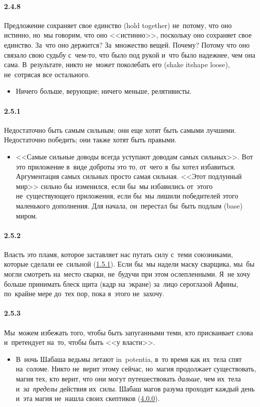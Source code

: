 \paragraph{2.4.8}\hypertarget{par:2.4.8}{} Предложение сохраняет свое единство (hold together) не~потому, что оно истинно, но~мы говорим, что оно <<истинно>>, поскольку оно сохраняет свое единство. За~что оно держится? За~множество вещей. Почему? Потому что оно связало свою судьбу с~чем-то, что было под рукой и~что было надежнее, чем она сама. В~результате, никто не~может поколебать его (shake itshape loose), не~сотрясая все остального. 
	\begin{itemize}
	\item 
	Ничего больше, верующие; ничего меньше, релятивисты.
	\end{itemize}

\paragraph{2.5.1}\hypertarget{par:2.5.1}{} Недостаточно быть самым сильным; они еще хотят быть самыми лучшими. Недостаточно победить; они также хотят быть правыми. 
	\begin{itemize}
	\item 
	<<Самые сильные доводы всегда уступают доводам самых сильных>>. Вот это приложение в~виде доброты это то, от~чего я~бы хотел избавиться. Аргументация самых сильных просто самая сильная. <<Этот подлунный мир>> сильно бы~изменился, если бы~мы избавились от~этого не~существующего приложения, если бы~мы лишили победителей этого маленького дополнения. Для начала, он~перестал бы~быть подлым (base) миром.
	\end{itemize}

\paragraph{2.5.2}\hypertarget{par:2.5.2}{} Власть это пламя, которое заставляет нас путать силу с~теми союзниками, которые сделали ее~сильной (\hyperlink{par:1.5.1}{1.5.1}). Если бы~мы надели маску сварщика, мы~бы могли смотреть на~место сварки, не~будучи при этом ослепленными. Я~не хочу больше принимать блеск щита (кадр на~экране) за~лицо сероглазой Афины, по~крайне мере до~тех пор, пока я~этого не~захочу.

\paragraph{2.5.3}\hypertarget{par:2.5.3}{} Мы~можем избежать того, чтобы быть запуганными теми, кто присваивает слова и~претендует на~то, чтобы быть <<у власти>>. 
	\begin{itemize}
	\item 
 В~ночь Шабаша ведьмы летают in~potentia, в~то время как их~тела спят на~соломе. Никто не~верит этому сейчас, но~магия продолжает существовать, магия тех, кто верит, что они могут путешествовать {\itshape дальше}, чем их~тела и~{\itshape за~пределы} действия их~силы. Шабаш магов разума проходит каждый день и~эта магия не~нашла своих скептиков (\hyperlink{par:4.0.0}{4.0.0}).
	\end{itemize}

